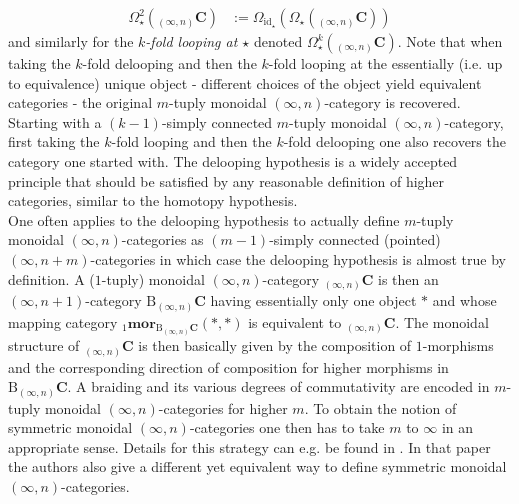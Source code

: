 \begin{itemize}
\begin{align*}
  \Omega_{\star}^{2}
  \left(
    {_{(\infty,n)}}\mathbf{C}
  \right)
  &:=
  \Omega_{\mathrm{id}_{\star}}
  \left(
    \Omega_{\star}
    \left(
      {_{(\infty,n)}}\mathbf{C}
    \right)
  \right)
\end{align*}
and similarly for the \textit{$k$-fold looping at $\star$} denoted $\Omega_{\star}^{k}({_{(\infty,n)}}\mathbf{C})$. Note that when taking the $k$-fold delooping and then the $k$-fold looping at the essentially (i.e. up to equivalence) unique object - different choices of the object yield equivalent categories - the original $m$-tuply monoidal $(\infty,n)$-category is recovered. Starting with a $(k-1)$-simply connected $m$-tuply monoidal $(\infty,n)$-category, first taking the $k$-fold looping and then the $k$-fold delooping one also recovers the category one started with. The delooping hypothesis is a widely accepted principle that should be satisfied by any reasonable definition of higher categories, similar to the homotopy hypothesis.
\\
One often applies to the delooping hypothesis to actually define $m$-tuply monoidal $(\infty,n)$-categories as $(m-1)$-simply connected (pointed) $(\infty,n+m)$-categories in which case the delooping hypothesis is almost true by definition. A ($1$-tuply) monoidal $(\infty,n)$-category ${_{(\infty,n)}}\mathbf{C}$ is then an $(\infty,n+1)$-category $\mathrm{B}{_{(\infty,n)}}\mathbf{C}$ having essentially only one object $\ast$ and whose mapping category ${_{1}}\mathbf{mor}_{\mathrm{B}{_{(\infty,n)}}\mathbf{C}}(\ast,\ast)$ is equivalent to ${_{(\infty,n)}}\mathbf{C}$. The monoidal structure of ${_{(\infty,n)}}\mathbf{C}$ is then basically given by the composition of $1$-morphisms and the corresponding direction of composition for higher morphisms in $\mathrm{B}{_{(\infty,n)}}\mathbf{C}$. A braiding and its various degrees of commutativity are encoded in $m$-tuply monoidal $(\infty,n)$-categories for higher $m$. To obtain the notion of symmetric monoidal $(\infty,n)$-categories one then has to take $m$ to $\infty$ in an appropriate sense. Details for this strategy can e.g. be found in \cite{29781dd2}. In that paper the authors also give a different yet equivalent way to define symmetric monoidal $(\infty,n)$-categories.


\end{itemize}
